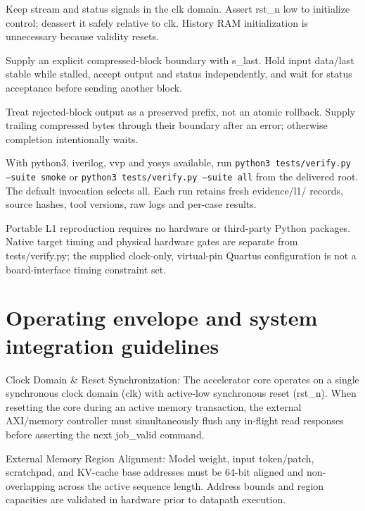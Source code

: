 \documentclass[11pt,a4paper]{article}
\begin{document}
Keep stream and status signals in the clk domain. Assert rst\_\allowbreak{}n low to initialize control; deassert it safely relative to clk. History RAM initialization is unnecessary because validity resets.


Supply an explicit compressed-block boundary with s\_\allowbreak{}last. Hold input data/\allowbreak{}last stable while stalled,\allowbreak{} accept output and status independently,\allowbreak{} and wait for status acceptance before sending another block.


Treat rejected-block output as a preserved prefix,\allowbreak{} not an atomic rollback. Supply trailing compressed bytes through their boundary after an error; otherwise completion intentionally waits.


With python3,\allowbreak{} iverilog,\allowbreak{} vvp and yosys available,\allowbreak{} run \texttt{python3 tests/\allowbreak{}verify.py --suite smoke} or \texttt{python3 tests/\allowbreak{}verify.py --suite all} from the delivered root. The default invocation selects all. Each run retains fresh evidence/\allowbreak{}l1/\allowbreak{} records,\allowbreak{} source hashes,\allowbreak{} tool versions,\allowbreak{} raw logs and per-case results.


Portable L1 reproduction requires no hardware or third-party Python packages. Native target timing and physical hardware gates are separate from tests/\allowbreak{}verify.py; the supplied clock-only,\allowbreak{} virtual-pin Quartus configuration is not a board-interface timing constraint set.


\section{Operating envelope and system integration guidelines}

Clock Domain \& Reset Synchronization: The accelerator core operates on a single synchronous clock domain (\allowbreak{}clk)\allowbreak{} with active-low synchronous reset (\allowbreak{}rst\_\allowbreak{}n)\allowbreak{}. When resetting the core during an active memory transaction,\allowbreak{} the external AXI/\allowbreak{}memory controller must simultaneously flush any in-flight read responses before asserting the next job\_\allowbreak{}valid command.


External Memory Region Alignment: Model weight,\allowbreak{} input token/\allowbreak{}patch,\allowbreak{} scratchpad,\allowbreak{} and KV-cache base addresses must be 64-bit aligned and non-overlapping across the active sequence length. Address bounds and region capacities are validated in hardware prior to datapath execution.
\end{document}
